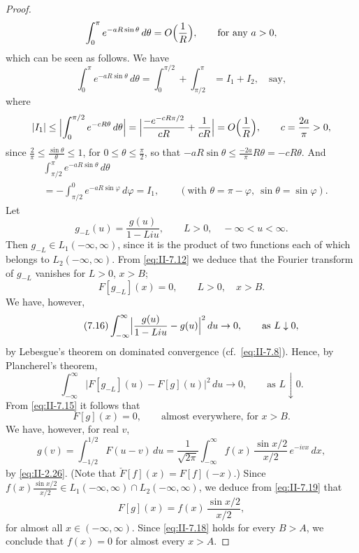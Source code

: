 \begin{proof}
\begin{equation}
\int_{0}^{\pi}e^{-aR\sin\theta}\,d\theta=O\Bigl(\frac{1}{R}\Bigr),\qquad\text{for any }a>0,
\end{equation}
which can be seen as follows. We have
\[
\int_{0}^{\pi}e^{-aR\sin\theta}\,d\theta
=\int_{0}^{\pi/2}+\int_{\pi/2}^{\pi}=I_{1}+I_{2},\quad\text{say},
\]
where
\[
|I_{1}|\le\Bigl|\int_{0}^{\pi/2}e^{-cR\theta}\,d\theta\Bigr|
=\Bigl|\frac{-e^{-cR\pi/2}}{cR}+\frac{1}{cR}\Bigr|
=O\Bigl(\frac{1}{R}\Bigr),\qquad c=\frac{2a}{\pi}>0,
\]
since $\frac{2}{\pi}\le\frac{\sin\theta}{\theta}\le 1$, for $0\le\theta\le\frac{\pi}{2}$, so that $-aR\sin\theta\le\frac{-2a}{\pi}R\theta=-cR\theta$. And
\[
\begin{aligned}
&\int_{\pi/2}^{\pi}e^{-aR\sin\theta}\,d\theta\\
&= -  \int_{\pi/2}^{0}e^{-aR\sin\varphi}\,d\varphi = I_{1},  \qquad(\text{with }\theta=\pi-\varphi,\ \sin\theta=\sin\varphi).
\end{aligned}
\]
Let
\begin{equation}\tag{7.14}\label{eq:II-7.14}
g_{-L}(u)=\frac{g(u)}{1-Liu},\qquad L>0,\quad -\infty<u<\infty.
\end{equation}
Then $g_{-L}\in L_{1}(-\infty,\infty)$, since it is the product of two functions each of which belongs to $L_{2}(-\infty,\infty)$. From \eqref{eq:II-7.12} we deduce that the Fourier transform of $g_{-L}$ vanishes for $L>0$, $x>B$;
\begin{equation}\tag{7.15}\label{eq:II-7.15}
F[g_{-L}](x)=0,\qquad L>0,\quad x>B.
\end{equation}
We have, however,
\begin{equation}\tag{7.16}\label{eq:II-7.16}
\int_{-\infty}^{\infty}\Bigl|\frac{g(u)}{1-Liu}-g(u)\Bigr|^{2}\,du\to 0,\qquad\text{as }L\downarrow 0,
\end{equation}
by Lebesgue's theorem on dominated convergence (cf.\ \eqref{eq:II-7.8}). Hence, by Plancherel's theorem,
\begin{equation}\tag{7.17}\label{eq:II-7.17}
\int_{-\infty}^{\infty}\bigl|F[g_{-L}](u)-F[g](u)\bigr|^{2}\,du\to 0,\qquad\text{as }L\downarrow 0.
\end{equation}
From \eqref{eq:II-7.15} it follows that
\begin{equation}\tag{7.18}\label{eq:II-7.18}
F[g](x)=0,\qquad\text{almost everywhere, for }x>B.
\end{equation}
We have, however, for real $v$,
\begin{equation}\tag{7.19}\label{eq:II-7.19}
g(v)=\int_{-1/2}^{1/2}F(u-v)\,du
=\frac{1}{\sqrt{2\pi}}\int_{-\infty}^{\infty}f(x)\,\frac{\sin x/2}{x/2}\,e^{-ivx}\,dx,
\end{equation}
by \eqref{eq:II-2.26}. (Note that $\check F[f](x)=F[f](-x)$.) Since $f(x)\frac{\sin x/2}{x/2}\in L_{1}(-\infty,\infty)\cap L_{2}(-\infty,\infty)$, we deduce from \eqref{eq:II-7.19} that
\[
F[g](x)=f(x)\,\frac{\sin x/2}{x/2},
\]
for almost all $x\in(-\infty,\infty)$. Since \eqref{eq:II-7.18} holds for every $B>A$, we conclude that $f(x)=0$ for almost every $x>A$.


\end{proof}
